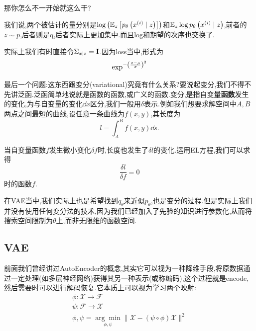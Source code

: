 	那你怎么不一开始就这么干?
	
	我们说,两个被估计的量分别是$\log\left( \mathbb{E}_z \left[ p_{\theta} \left( x^{(i)}  \mid z\right)\right]\right)$和$\mathbb{E}_{z} \log p_{\theta} \left( x^{(i)}\mid z\right)$,前者的$z \sim p$,后者则是q,后者实际上更加集中.而且log和期望的次序也交换了.
	
	实际上我们有时直接令$\Sigma_{x \mid z} = \bold{I}$.因为loss当中,形式为
	\begin{equation}
		\exp^{-\left( \frac{x - \mu}{\sigma}\right)^2}
	\end{equation}
	
	最后一个问题:这东西跟变分(variational)究竟有什么关系?要说起变分,我们不得不先讲泛函.泛函简单地说就是函数的函数,或广义的函数.变分,是指自变量\textbf{函数}发生的变化,为与自变量的变化$\dd x$区分,我们一般用$\delta$表示.例如我们想要求解空间中$A, B$两点之间最短的曲线,设任意一条曲线为$f(x, y)$,其长度为
	\begin{equation}
		l = \int_{A}^{B} f(x,  y) \dd s.
	\end{equation}

	当自变量函数$f$发生微小变化$\delta f$时,长度也发生了$\delta l$的变化.运用EL方程,我们可以求得
	\begin{equation}
		\frac{\delta l}{\delta f} = 0
	\end{equation}
	时的函数$f$.
	
	在VAE当中,我们实际上也是希望找到$q_\theta$来近似$p_{\theta}$,也是变分的过程.但是实际上我们并没有使用任何变分法的技术,因为我们已经加入了先验的知识进行参数化,从而将搜索空间限制为$\theta$上,而非无限维的函数空间.
	
	
	\subsection{VAE}
	
	前面我们曾经讲过AutoEncoder的概念,其实它可以视为一种降维手段,将原数据通过一定处理(如多层神经网络)获得其另一种表示(或称编码),这个过程就是encode,然后需要时可以进行解码恢复.它本质上可以视为学习两个映射:
	\begin{equation}
		\begin{array}{l}
			\phi: \mathcal{X} \rightarrow \mathcal{F} \\
			\psi: \mathcal{F} \rightarrow \mathcal{X} \\
			\phi, \psi=\underset{\phi, \psi}{\arg \min }\|\mathcal{X}-(\psi \circ \phi) \mathcal{X}\|^{2}
		\end{array}
	\end{equation}
	
